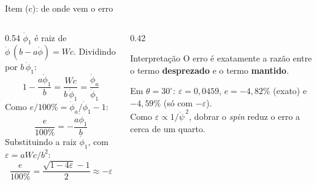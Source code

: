 \documentclass[11pt,aspectratio=169]{beamer}
\newcommand{\phid}{\dot{\phi}}
\newcommand{\psid}{\dot{\psi}}
\newcommand{\eps}{\varepsilon}
\begin{document}
\begin{frame}{Item (c): de onde vem o erro}
  \begin{columns}[c]
    \begin{column}{0.54\textwidth}
      $\phid_1$ é raiz de $\phid\,(b-a\phid)=Wc$. Dividindo por $b\,\phid_1$:
      \[
        1-\frac{a\phid_1}{b}=\frac{Wc}{b\,\phid_1}=\frac{\phid_a}{\phid_1}
      \]
      Como $e/100\%=\phid_a/\phid_1-1$:
      \[
        \frac{e}{100\%}=-\frac{a\phid_1}{b}
      \]
      Substituindo a raiz $\phid_1$, com $\eps=aWc/b^2$:
      \[
        \frac{e}{100\%}=\frac{\sqrt{1-4\eps}-1}{2}\approx-\eps
      \]
    \end{column}
    \begin{column}{0.42\textwidth}
      \begin{block}{Interpretação}
        O erro é exatamente a razão entre o termo \textbf{desprezado} e o termo \textbf{mantido}.
      \end{block}
      \vspace{0.2cm}
      {\small
      Em $\theta=30^\circ$: $\eps=0,0459$, $e=-4,82\%$ (exato) e $-4,59\%$ (só com $-\eps$).\\[0.15cm]
      Como $\eps\propto1/\psid^{\,2}$, dobrar o \textit{spin} reduz o erro a cerca de um quarto.}
    \end{column}
  \end{columns}
\end{frame}
\end{document}

